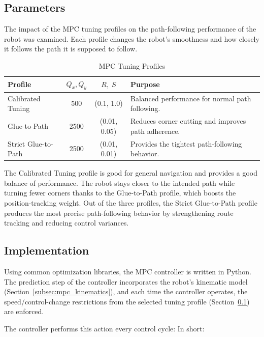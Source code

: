 \subsection{Parameters}
\label{subsec:mpc_parameters}

The impact of the MPC tuning profiles on the path-following performance of the robot was examined. Each profile changes the robot’s smoothness and how closely it follows the path it is supposed to follow.

\begin{table}[H]
	\centering
	\caption{MPC Tuning Profiles}
	\label{tab:mpc_profiles}
	\begin{tabular}{|p{3.8cm}|c|c|p{5.2cm}|}
		\hline
		\textbf{Profile} & \textbf{$Q_x,Q_y$} & \textbf{$R,\;S$} & \textbf{Purpose} \\
		\hline
		Calibrated Tuning & 500 & (0.1, 1.0) & Balanced performance for normal path following. \\
		\hline
		Glue-to-Path & 2500 & (0.01, 0.05) & Reduces corner cutting and improves path adherence. \\
		\hline
		Strict Glue-to-Path & 2500 & (0.01, 0.01) & Provides the tightest path-following behavior. \\
		\hline
	\end{tabular}
\end{table}
The Calibrated Tuning profile is good for general navigation and provides a good balance of performance. The robot stays closer to the intended path while turning fewer corners thanks to the Glue-to-Path profile, which boosts the position-tracking weight. Out of the three profiles, the Strict Glue-to-Path profile produces the most precise path-following behavior by strengthening route tracking and reducing control variances.



\subsection{Implementation}
\label{subsec:mpc_implementation}

Using common optimization libraries, the MPC controller is written in Python. The prediction step of the controller incorporates the robot's kinematic model (Section~\ref{subsec:mpc_kinematics}), and each time the controller operates, the speed/control-change restrictions from the selected tuning profile (Section~\ref{subsec:mpc_parameters}) are enforced.

The controller performs this action every control cycle: In short:



